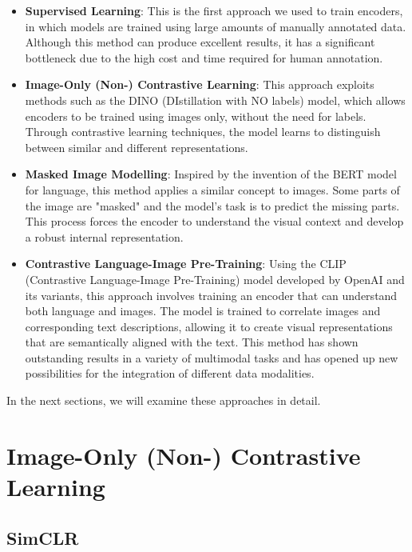 \begin{itemize}
    \item \textbf{Supervised Learning}: This is the first approach we used to train encoders, in which models are trained using large amounts of manually annotated data. Although this method can produce excellent results, it has a significant bottleneck due to the high cost and time required for human annotation.
    
    \item \textbf{Image-Only (Non-) Contrastive Learning}: This approach exploits methods such as the DINO (DIstillation with NO labels) model, which allows encoders to be trained using images only, without the need for labels. Through contrastive learning techniques, the model learns to distinguish between similar and different representations.
    
    \item \textbf{Masked Image Modelling}: Inspired by the invention of the BERT model for language, this method applies a similar concept to images. Some parts of the image are "masked" and the model's task is to predict the missing parts. This process forces the encoder to understand the visual context and develop a robust internal representation.
    
    \item \textbf{Contrastive Language-Image Pre-Training}: Using the CLIP (Contrastive Language-Image Pre-Training) model developed by OpenAI and its variants, this approach involves training an encoder that can understand both language and images. The model is trained to correlate images and corresponding text descriptions, allowing it to create visual representations that are semantically aligned with the text. This method has shown outstanding results in a variety of multimodal tasks and has opened up new possibilities for the integration of different data modalities.
\end{itemize}

In the next sections, we will examine these approaches in detail.

\section{Image-Only (Non-) Contrastive Learning}

\subsection{SimCLR}

